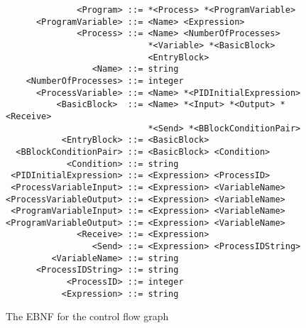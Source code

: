 \begin{figure}
\small
\begin{verbatim}
              <Program> ::= *<Process> *<ProgramVariable>
      <ProgramVariable> ::= <Name> <Expression>
              <Process> ::= <Name> <NumberOfProcesses>
                            *<Variable> *<BasicBlock>
                            <EntryBlock>
                 <Name> ::= string
    <NumberOfProcesses> ::= integer
      <ProcessVariable> ::= <Name> *<PIDInitialExpression>
          <BasicBlock>  ::= <Name> *<Input> *<Output> *<Receive>
                            *<Send> *<BBlockConditionPair>
           <EntryBlock> ::= <BasicBlock>
  <BBlockConditionPair> ::= <BasicBlock> <Condition> 
            <Condition> ::= string
 <PIDInitialExpression> ::= <Expression> <ProcessID>
 <ProcessVariableInput> ::= <Expression> <VariableName>
<ProcessVariableOutput> ::= <Expression> <VariableName>
 <ProgramVariableInput> ::= <Expression> <VariableName>
<ProgramVariableOutput> ::= <Expression> <VariableName>
              <Receive> ::= <Expression>
                 <Send> ::= <Expression> <ProcessIDString>
         <VariableName> ::= string
      <ProcessIDString> ::= string
            <ProcessID> ::= integer
           <Expression> ::= string
\end{verbatim}
\normalsize
\caption{The EBNF for the control flow graph}
\label{fig:CFGEBNF}
\end{figure}